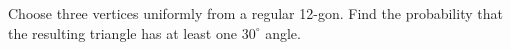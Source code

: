 Choose three vertices uniformly from a regular 12-gon. Find the probability that the resulting triangle has at least one $ 30^\circ $ angle.
